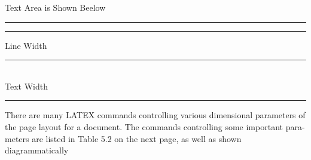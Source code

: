 \documentclass{article}
\begin{document}
\centering %

Text Area is Shown Beelow
\rule{\textwidth}{\textheight}
\rule{\textwidth}{\textheight}

Line Width
\rule{\linewidth}{1pt} %
\\[20pt]
Text Width
\rule{\textwidth}{1pt}


\newpage
\enlargethispage{20mm} %
There are many LATEX commands controlling various dimensional parameters of the page layout for a document. The commands controlling some important para- meters 
are listed in Table 5.2 on the next page, as well as shown diagrammatically
\end{document}
